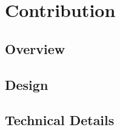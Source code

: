 

\chapter{Contribution}
\label{ch:contribution}

\section{Overview}
\label{sec:contribution:overview}

\kant[21-23]

\section{Design}
\label{sec:contribution:design}

\kant[24-26]

\section{Technical Details}
\label{sec:contribution:technical+details}

\kant[27-29]

